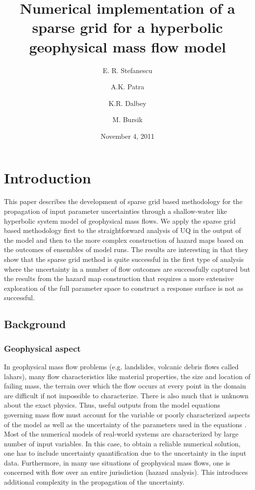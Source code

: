 \documentclass{article}
\begin{document}
\title{Numerical implementation of a sparse grid for a hyperbolic geophysical mass flow model}
\author[1]{ E. R. Stefanescu }
\author[1]{A.K. Patra}
\author[2]{K.R. Dalbey}
\author[3]{M. Bursik}


\date{November 4, 2011}


\maketitle


\section{Introduction}
This paper describes the development of sparse grid based methodology for the propagation of input 
parameter uncertainties through a shallow-water like hyperbolic system model of 
geophysical mass flows. We apply the sparse grid based 
methodology first to the straightforward analysis of  UQ in the output of 
the model and then to the more complex construction of hazard maps based on the 
outcomes of ensembles of model runs. The results are interesting in that they show that the sparse grid 
method is quite successful in the first type of analysis where the uncertainty in a number of flow outcomes are successfully 
captured but the results from the hazard map construction that requires a more extensive exploration of the 
full parameter space to construct a response surface is not as successful.

\subsection{Background} 
\subsubsection{Geophysical aspect} In geophysical mass flow problems (e.g. landslides, volcanic debris flows called lahars), many flow characteristics like
material properties, the size and location of failing mass, the terrain over which the 
flow occurs at every point in the domain are difficult if not impossible to characterize. There is also much that is unknown about the
exact physics. Thus, useful outputs from the model equations governing mass flow must account for 
the variable or poorly characterized aspects of the model as well as the uncertainty of the 
parameters used in the equations \citep{Keith}. 
Most of the numerical models of real-world systems are characterized by large number of input
variables. In this case, to obtain a reliable numerical 
solution, one has to include uncertainty quantification due to the uncertainty in the input data. Furthermore, 
in many use situations of geophysical mass flows, one is concerned with flow over an entire jurisdiction (hazard analysis). 
This introduces additional complexity in the propagation of the uncertainty.
\end{document}
